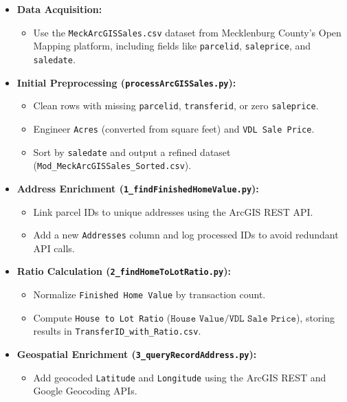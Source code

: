 \begin{itemize}
    \item \textbf{Data Acquisition:}
    \begin{itemize}
        \item Use the \texttt{MeckArcGISSales.csv} dataset from Mecklenburg County's Open Mapping platform, including fields like \texttt{parcelid}, \texttt{saleprice}, and \texttt{saledate}.
    \end{itemize}

    \item \textbf{Initial Preprocessing (\texttt{processArcGISSales.py}):}
    \begin{itemize}
        \item Clean rows with missing \texttt{parcelid}, \texttt{transferid}, or zero \texttt{saleprice}.
        \item Engineer \texttt{Acres} (converted from square feet) and \texttt{VDL Sale Price}.
        \item Sort by \texttt{saledate} and output a refined dataset (\texttt{Mod\_MeckArcGISSales\_Sorted.csv}).
    \end{itemize}

    \item \textbf{Address Enrichment (\texttt{1\_findFinishedHomeValue.py}):}
    \begin{itemize}
        \item Link parcel IDs to unique addresses using the ArcGIS REST API.
        \item Add a new \texttt{Addresses} column and log processed IDs to avoid redundant API calls.
    \end{itemize}

    \item \textbf{Ratio Calculation (\texttt{2\_findHomeToLotRatio.py}):}
    \begin{itemize}
        \item Normalize \texttt{Finished Home Value} by transaction count.
        \item Compute \texttt{House to Lot Ratio} (\(\texttt{House Value} / \texttt{VDL Sale Price}\)), storing results in \texttt{TransferID\_with\_Ratio.csv}.
    \end{itemize}

    \item \textbf{Geospatial Enrichment (\texttt{3\_queryRecordAddress.py}):}
    \begin{itemize}
        \item Add geocoded \texttt{Latitude} and \texttt{Longitude} using the ArcGIS REST and Google Geocoding APIs.
    \end{itemize}


\end{itemize}
